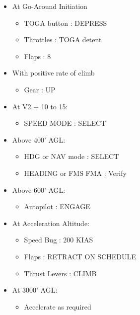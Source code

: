 \begin{itemize}
\item At Go-Around Initiation

\begin{itemize}
\item TOGA button : DEPRESS

\item Throttles : TOGA detent

\item Flaps : 8

\end{itemize}

\item With positive rate of climb

\begin{itemize}
\item Gear : UP

\end{itemize}

\item At V2 + 10 to 15:

\begin{itemize}
\item SPEED MODE : SELECT

\end{itemize}

\item Above 400' AGL:

\begin{itemize}
\item HDG or NAV mode : SELECT

\item HEADING or FMS FMA : Verify

\end{itemize}

\item Above 600' AGL:

\begin{itemize}
\item Autopilot : ENGAGE

\end{itemize}

\item At Acceleration Altitude:

\begin{itemize}
\item Speed Bug : 200 KIAS

\item Flaps : RETRACT ON SCHEDULE

\item Thrust Levers : CLIMB

\end{itemize}

\item At 3000' AGL:

\begin{itemize}
\item Accelerate as required

\end{itemize}

\end{itemize}

